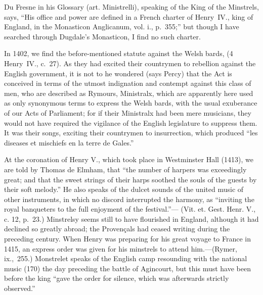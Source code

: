 

Du Fresne in his Glossary (art. Ministrelli), speaking of the King of the
Minstrels, says, “His office and power are defined in a French charter of
Henry~IV., king of England, in the Monasticon Anglicanum, vol. i., p.~355;”
but though I have searched through Dugdale’s Monasticon, I find no such
charter.


In 1402, we find the before-mentioned statute against the Welsh bards,%
(4 Henry~IV., c.~27). %
As they had excited their countrymen to rebellion
against the English government, it is not to he wondered (says Percy) that the
Act is conceived in terms of the utmost indignation and contempt against this
class of men, who are described as Rymours, Ministralx, which are apparently
here used as only synonymous terms to express the Welsh bards, with the usual
exuberance of our Acts of Parliament; for if their Ministralx had been mere
musicians, they would not have required the vigilance of the English legislature
to suppress them. It was their songs, exciting their countrymen to insurrection,
which produced “les diseases et mischiefs en la terre de Gales.”

At the coronation of Henry V., which took place in Westminster Hall (1413),
we are told by Thomas de Elmham, that “the number of harpers was exceedingly
great; and that the sweet strings of their harps soothed the souls of the guests
by their soft melody.” He also speaks of the dulcet sounds of the united
music of other instruments, in which no discord interrupted the harmony,
as “inviting the royal banqueters to the full enjoyment of the festival.”—
(Vit. et. Gest. Henr. V., c. 12, p.~23.) Minstrelsy seems still to have
flourished in England, although it had declined so greatly abroad; the Provençals
had ceased writing during the preceding century. When Henry was preparing
for his great voyage to France in 1415, an express order was given for his
minstrels to attend him.—(Rymer, ix.,~255.) Monstrelet speaks of the English
camp resounding with the national music (170) the day preceding the battle of
Agincourt, but this must have been before the king “gave the order for silence,
which was afterwards strictly observed.”

